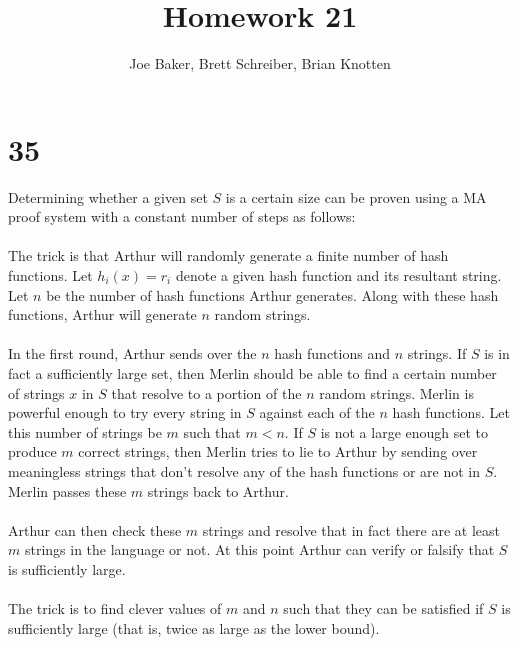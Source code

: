 \documentclass[letterpaper,notitlepage,twoside]{article}
\begin{document}
\title{Homework 21}
\author{Joe Baker, Brett Schreiber, Brian Knotten}
\maketitle

\section*{35}

Determining whether a given set $S$ is a certain size can be proven using a MA proof system with a constant number of steps as follows: \\\\

The trick is that Arthur will randomly generate a finite number of hash functions. Let $h_i(x) = r_i$ denote a given hash function and its resultant string. Let $n$ be the number of hash functions Arthur generates. Along with these hash functions, Arthur will generate $n$ random strings. \\\\

In the first round, Arthur sends over the $n$ hash functions and $n$ strings. If $S$ is in fact a sufficiently large set, then Merlin should be able to find a certain number of strings $x$ in $S$ that resolve to a portion of the $n$ random strings. Merlin is powerful enough to try every string in $S$ against each of the $n$ hash functions. Let this number of strings be $m$ such that $m < n$. If $S$ is not a large enough set to produce $m$ correct strings, then Merlin tries to lie to Arthur by sending over meaningless strings that don't resolve any of the hash functions or are not in $S$. Merlin passes these $m$ strings back to Arthur. \\\\

Arthur can then check these $m$ strings and resolve that in fact there are at least $m$ strings in the language or not. At this point Arthur can verify or falsify that $S$ is sufficiently large. \\\\

The trick is to find clever values of $m$ and $n$ such that they can be satisfied if $S$ is sufficiently large (that is, twice as large as the lower bound). \\\\
\end{document}
